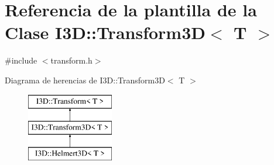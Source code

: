 \hypertarget{class_i3_d_1_1_transform3_d}{}\section{Referencia de la plantilla de la Clase I3D\+:\+:Transform3D$<$ T $>$}
\label{class_i3_d_1_1_transform3_d}


{\ttfamily \#include $<$transform.\+h$>$}

Diagrama de herencias de I3D\+:\+:Transform3D$<$ T $>$\begin{figure}[H]
\begin{center}
\leavevmode
\includegraphics[height=3.000000cm]{class_i3_d_1_1_transform3_d}
\end{center}
\end{figure}
